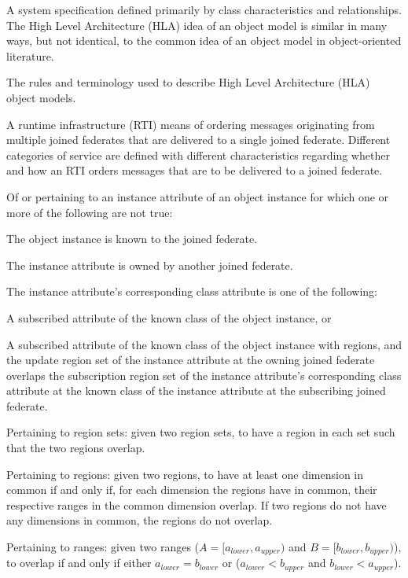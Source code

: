 \clearpage
{} A system specification defined primarily by class characteristics and relationships. The High Level Architecture (HLA) idea of an object model is similar in many ways, but not identical, to the common idea of an object model in object-oriented literature.

 The rules and terminology used to describe High Level Architecture (HLA) object models.

 A runtime infrastructure (RTI) means of ordering messages originating from multiple joined federates that are delivered to a single joined federate. Different categories of service are defined with different characteristics regarding whether and how an RTI orders messages that are to be delivered to a joined federate.

 Of or pertaining to an instance attribute of an object instance for which one or more of the following are not true:
\begin{stdalphalist}
    \item The object instance is known to the joined federate.
    \item The instance attribute is owned by another joined federate.
    \item The instance attribute's corresponding class attribute is one of the following:
    \begin{stdnumlist}
        \item A subscribed attribute of the known class of the object instance, or
        \item A subscribed attribute of the known class of the object instance with regions, and the update region set of the instance attribute at the owning joined federate overlaps the subscription region set of the instance attribute's corresponding class attribute at the known class of the instance attribute at the subscribing joined federate.
    \end{stdnumlist}
\end{stdalphalist}

\begin{stdalphalist}
    \item Pertaining to region sets: given two region sets, to have a region in each set such that the two regions overlap.
    \item Pertaining to regions: given two regions, to have at least one dimension in common if and only if, for each dimension the regions have in common, their respective ranges in the common dimension overlap. If two regions do not have any dimensions in common, the regions do not overlap.
    \item Pertaining to ranges: given two ranges ($A=[a_{lower},a_{upper})$ and $B=[b_{lower},b_{upper})$), to overlap if and only if either $a_{lower}=b_{lower}$ or ($a_{lower}<b_{upper}$ and $b_{lower}<a_{upper}$).
\end{stdalphalist}

